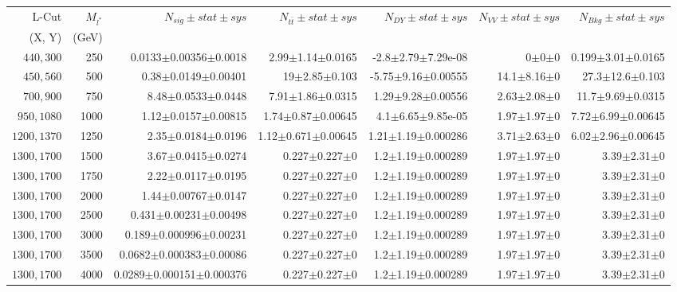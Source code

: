 \documentclass[]{article}
\begin{document}
\begin{table}
\begin{center}
\scriptsize{
\begin{tabular}{ |r|r|r|r|r|r|r|}
\hline 
L-Cut & $M_{l^*}$ & $N_{sig}\pm stat \pm sys $ &$N_{t\bar{t}}\pm stat \pm sys $ & $N_{DY}\pm stat \pm sys $ & $N_{VV}\pm stat \pm sys $ &$N_{Bkg}\pm stat \pm sys$\\
(X, Y) & (GeV) & && &&\\
\hline 
$440, 300$ & 250 & 0.0133$\pm$0.00356$\pm$0.0018 & 2.99$\pm$1.14$\pm$0.0165 & -2.8$\pm$2.79$\pm$7.29e-08 & 0$\pm$0$\pm$0 & 0.199$\pm$3.01$\pm$0.0165 \\
$450, 560$ & 500 & 0.38$\pm$0.0149$\pm$0.00401 & 19$\pm$2.85$\pm$0.103 & -5.75$\pm$9.16$\pm$0.00555 & 14.1$\pm$8.16$\pm$0 & 27.3$\pm$12.6$\pm$0.103 \\
$700, 900$ & 750 & 8.48$\pm$0.0533$\pm$0.0448 & 7.91$\pm$1.86$\pm$0.0315 & 1.29$\pm$9.28$\pm$0.00556 & 2.63$\pm$2.08$\pm$0 & 11.7$\pm$9.69$\pm$0.0315 \\
$950, 1080$ & 1000 & 1.12$\pm$0.0157$\pm$0.00815 & 1.74$\pm$0.87$\pm$0.00645 & 4.1$\pm$6.65$\pm$9.85e-05 & 1.97$\pm$1.97$\pm$0 & 7.72$\pm$6.99$\pm$0.00645 \\
$1200, 1370$ & 1250 & 2.35$\pm$0.0184$\pm$0.0196 & 1.12$\pm$0.671$\pm$0.00645 & 1.21$\pm$1.19$\pm$0.000286 & 3.71$\pm$2.63$\pm$0 & 6.02$\pm$2.96$\pm$0.00645 \\
$1300, 1700$ & 1500 & 3.67$\pm$0.0415$\pm$0.0274 & 0.227$\pm$0.227$\pm$0 & 1.2$\pm$1.19$\pm$0.000289 & 1.97$\pm$1.97$\pm$0 & 3.39$\pm$2.31$\pm$0 \\
$1300, 1700$ & 1750 & 2.22$\pm$0.0117$\pm$0.0195 & 0.227$\pm$0.227$\pm$0 & 1.2$\pm$1.19$\pm$0.000289 & 1.97$\pm$1.97$\pm$0 & 3.39$\pm$2.31$\pm$0 \\
$1300, 1700$ & 2000 & 1.44$\pm$0.00767$\pm$0.0147 & 0.227$\pm$0.227$\pm$0 & 1.2$\pm$1.19$\pm$0.000289 & 1.97$\pm$1.97$\pm$0 & 3.39$\pm$2.31$\pm$0 \\
$1300, 1700$ & 2500 & 0.431$\pm$0.00231$\pm$0.00498 & 0.227$\pm$0.227$\pm$0 & 1.2$\pm$1.19$\pm$0.000289 & 1.97$\pm$1.97$\pm$0 & 3.39$\pm$2.31$\pm$0 \\
$1300, 1700$ & 3000 & 0.189$\pm$0.000996$\pm$0.00231 & 0.227$\pm$0.227$\pm$0 & 1.2$\pm$1.19$\pm$0.000289 & 1.97$\pm$1.97$\pm$0 & 3.39$\pm$2.31$\pm$0 \\
$1300, 1700$ & 3500 & 0.0682$\pm$0.000383$\pm$0.00086 & 0.227$\pm$0.227$\pm$0 & 1.2$\pm$1.19$\pm$0.000289 & 1.97$\pm$1.97$\pm$0 & 3.39$\pm$2.31$\pm$0 \\
$1300, 1700$ & 4000 & 0.0289$\pm$0.000151$\pm$0.000376 & 0.227$\pm$0.227$\pm$0 & 1.2$\pm$1.19$\pm$0.000289 & 1.97$\pm$1.97$\pm$0 & 3.39$\pm$2.31$\pm$0 \\

\end{tabular}}
\end{center}
\end{table}
\end{document}
